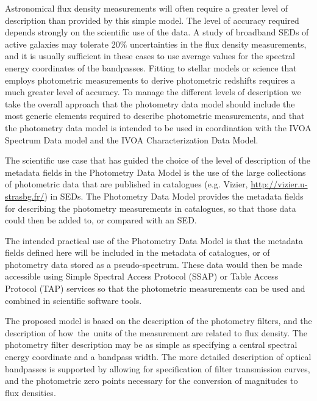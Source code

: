 \documentclass[11pt,a4paper]{ivoa}
\begin{document}
Astronomical flux density measurements will often require a greater level of description than provided by this simple model. The level of accuracy required depends strongly on the scientific use of the data. A study of broadband SEDs of active galaxies may tolerate 20$\%$  uncertainties in the flux density measurements, and it is usually sufficient in these cases to use average values for the spectral energy coordinates of the bandpasses. Fitting to stellar models or science that employs photometric measurements to derive photometric redshifts requires a much greater level of accuracy. To manage the different levels of description we take the overall approach that the photometry data model should include the most generic elements required to describe photometric measurements, and that the photometry data model is intended to be used in coordination with the IVOA Spectrum Data model and the IVOA Characterization Data Model.
\par

The scientific use case that has guided the choice of the level of description of the metadata fields in the Photometry Data Model is the use of the large collections of photometric data that are published in catalogues (e.g. Vizier, \url{http://vizier.u-strasbg.fr/}) in SEDs. The Photometry Data Model provides the metadata fields for describing the photometry measurements in catalogues, so that those data could then be added to, or compared with an SED. 
\par

The intended practical use of the Photometry Data Model is that the metadata fields defined here will be included in the metadata of catalogues, or of photometry data stored as a pseudo-spectrum. These data would then be made accessible using Simple Spectral Access Protocol (SSAP) or Table Access Protocol (TAP) services so that the photometric measurements can be used and combined in scientific software tools. 

\par
The proposed model is based on the description of the photometry filters, and the description of how\ the\ units of the measurement are related to flux density. The photometry filter description may be as simple as specifying a central spectral energy coordinate and a bandpass width. The more detailed description of optical bandpasses is supported by allowing for specification of filter transmission curves, and the   photometric zero points necessary for the conversion of magnitudes to flux densities. 
\par
\end{document}

